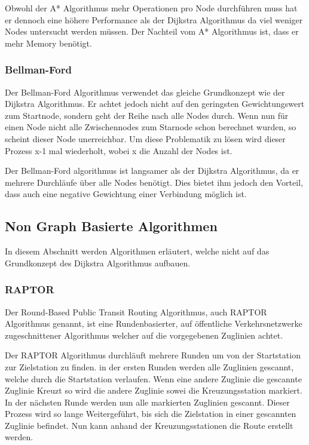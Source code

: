 Obwohl der A* Algorithmus mehr Operationen pro Node durchführen muss hat er dennoch eine höhere Performance als der Dijkstra Algorithmus da viel weniger Nodes untersucht werden müssen. Der Nachteil vom A* Algorithmus ist, dass er mehr Memory benötigt.

 

\subsubsection{Bellman-Ford}
\label{sec:Bellman-Ford}
Der Bellman-Ford Algorithmus verwendet das gleiche Grundkonzept wie der Dijkstra Algorithmus. Er achtet jedoch nicht auf den geringsten Gewichtungswert zum Startnode, sondern geht der Reihe nach alle Nodes durch. Wenn nun für einen Node nicht alle Zwischennodes zum Starnode schon berechnet wurden, so scheint dieser Node unerreichbar. Um diese Problematik zu lösen wird dieser Prozess x-1 mal wiederholt, wobei x die Anzahl der Nodes ist.

Der Bellman-Ford algorithmus ist langsamer als der Dijkstra Algorithmus, da er mehrere Durchläufe über alle Nodes benötigt. Dies bietet ihm jedoch den Vorteil, dass auch eine negative Gewichtung einer Verbindung möglich ist.

\subsection{Non Graph Basierte Algorithmen}
\label{sec:Non Graph Basierte Algorithmen}
In diesem Abschnitt werden Algorithmen erläutert, welche nicht auf das Grundkonzept des Dijkstra Algorithmus aufbauen.

\subsubsection{RAPTOR}
\label{sec:RAPTOR}
Der Round-Based Public Transit Routing Algorithmus, auch RAPTOR Algorithmus genannt, ist eine Rundenbasierter, auf öffentliche Verkehrsnetzwerke zugeschnittener Algorithmus welcher auf die vorgegebenen Zuglinien achtet.

Der RAPTOR Algorithmus durchläuft mehrere Runden um von der Startstation zur Zielstation zu finden. in der ersten Runden werden alle Zuglinien gescannt, welche durch die Startstation verlaufen. Wenn eine andere Zuglinie die gescannte Zuglinie Kreuzt so wird die andere Zuglinie sowei die Kreuzungsstation markiert. In der nächsten Runde werden nun alle markierten Zuglinien gescannt. Dieser Prozess wird so lange Weitergeführt, bis sich die Zielstation in einer gescannten Zuglinie befindet. Nun kann anhand der Kreuzungsstationen die Route erstellt werden.

